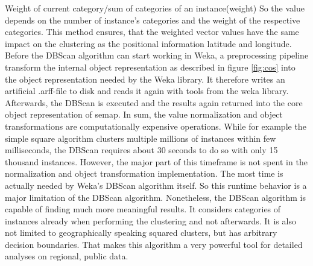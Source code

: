 Weight of current category/sum of categories of an instance(weight)
So the value depends on the number of instance’s categories and the weight of the respective categories. This method ensures, that the weighted vector values have the same impact on the clustering as the positional information latitude and longitude. Before the DBScan algorithm can start working in Weka, a preprocessing pipeline transform the internal object representation as described in figure \ref{fig:cos} into the object representation needed by the Weka library. It therefore writes an artificial .arff-file to disk and reads it again with tools from the weka library. Afterwards, the DBScan is executed and the results again returned into the core object representation of semap. In sum, the value normalization and object transformations are computationally expensive operations. While for example the simple square algorithm clusters multiple millions of instances within few milliseconds, the DBScan requires about 30 seconds to do so with only 15 thousand instances. However, the major part of this timeframe is not spent in the normalization and object transformation implementation. The most time is actually needed by Weka’s DBScan algorithm itself. So this runtime behavior is a major limitation of the DBScan algorithm. Nonetheless, the DBScan algorithm is capable of finding much more meaningful results. It considers categories of instances already when performing the clustering and not afterwards. It is also not limited to geographically speaking squared clusters, but has arbitrary decision boundaries. That makes this algorithm a very powerful tool for detailed analyses on regional, public data.

